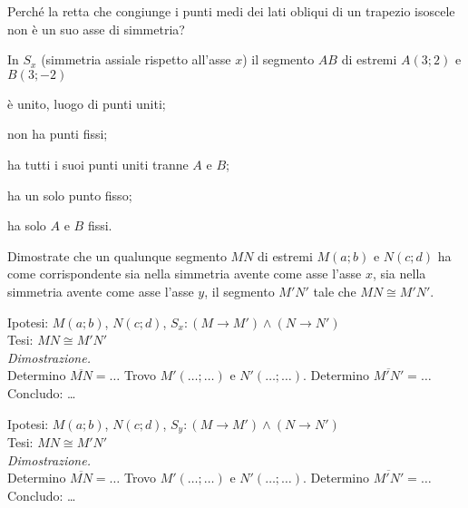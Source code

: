 \begin{esercizio}
\label{ese:8.26}
Perché la retta che congiunge i punti medi dei lati obliqui di un trapezio isoscele non è un suo asse di simmetria?
\end{esercizio}

\begin{esercizio}
\label{ese:8.27}
In $S_x$ (simmetria assiale rispetto all'asse $x$) il segmento $AB$ di estremi $A(3;2)$ e $B(3;-2)$
\begin{enumeratea}
\item è unito, luogo di punti uniti;
\item non ha punti fissi;
\item ha tutti i suoi punti uniti tranne $A$ e $B$;
\item ha un solo punto fisso;
\item ha solo $A$ e $B$ fissi.
\end{enumeratea}
\end{esercizio}

\begin{esercizio}
\label{ese:8.28}
Dimostrate che un qualunque segmento $MN$ di estremi $M(a;b)$ e $N(c;d)$ ha come corrispondente sia nella simmetria avente come asse l'asse $x$, sia nella simmetria avente come asse l'asse $y$, il segmento $M'N'$ tale che $MN\cong M'N'$.\vspace{5pt}

\noindent Ipotesi: $M(a;b)$, $N(c;d)$, $S_x:(M\rightarrow M') \wedge (N\rightarrow N')$\\
Tesi: $MN\cong M'N'$\vspace{3pt}\\
\emph{Dimostrazione.}\\
Determino $\overline{MN}=\ldots{}$ Trovo $M'(\ldots{};\ldots{})$ e $N'(\ldots{};\ldots{})$. Determino $\overline{M'N'}=\ldots{}$\\
Concludo: \ldots{}\vspace{5pt}

\noindent Ipotesi: $M(a;b)$, $N(c;d)$, $S_y:(M\rightarrow M') \wedge (N\rightarrow N')$\\
Tesi: $MN\cong M'N'$\vspace{3pt}\\
\emph{Dimostrazione.}\\
Determino $\overline{MN}=\ldots{}$ Trovo $M'(\ldots{};\ldots{})$ e $N'(\ldots{};\ldots{})$. Determino $\overline{M'N'}=\ldots{}$\\
Concludo: \ldots{}
\end{esercizio}

